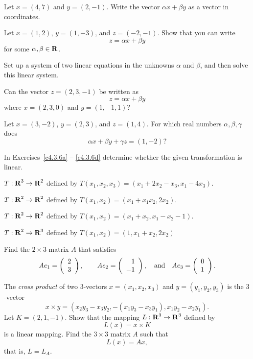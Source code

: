 \begin{exercise} \label{c4.3.2}
Let $x=(4,7)$ and $y=(2,-1)$.  Write the vector $\alpha x+\beta
y$ as a vector in coordinates.
\end{exercise}

\begin{exercise} \label{c4.3.3}
Let $x=(1,2)$, $y=(1,-3)$, and $z=(-2,-1)$.  Show that you can
write
\[
z=\alpha x+ \beta y
\]
for some $\alpha,\beta\in\mbox{$\bf{R}$}$.

 Set up a system of two linear equations in
the unknowns $\alpha$ and $\beta$, and then solve this linear
system.
\end{exercise}

\begin{exercise} \label{c4.3.4}
Can the vector $z=(2,3,-1)$ be written as
\[
z=\alpha x+ \beta y
\]
where $x=(2,3,0)$ and $y=(1,-1,1)$?
\end{exercise}

\begin{exercise} \label{c4.3.5}
Let $x=(3,-2)$, $y=(2,3)$, and $z=(1,4)$.  For which real
numbers $\alpha,\beta,\gamma$ does
\[
\alpha x + \beta y + \gamma z = (1,-2)?
\]
\end{exercise}

\noindent In Exercises~\ref{c4.3.6a} -- \ref{c4.3.6d} determine
whether the given transformation is linear.
\begin{exercise} \label{c4.3.6a}
  $T:\mbox{$\bf{R}$}^3\to\mbox{$\bf{R}$}^2$ defined by $T(x_1,x_2,x_3)=(x_1+2x_2-x_3,x_1-4x_3)$.
\end{exercise}
\begin{exercise} \label{c4.3.6b}
  $T:\mbox{$\bf{R}$}^2\to\mbox{$\bf{R}$}^2$ defined by $T(x_1,x_2)=(x_1+x_1x_2,2x_2)$.
\end{exercise}
\begin{exercise} \label{c4.3.6c}
  $T:\mbox{$\bf{R}$}^2\to\mbox{$\bf{R}$}^2$ defined by $T(x_1,x_2)=(x_1+x_2,x_1-x_2-1)$.
\end{exercise}
\begin{exercise} \label{c4.3.6d}
  $T:\mbox{$\bf{R}$}^2\to\mbox{$\bf{R}$}^3$ defined by $T(x_1,x_2)=(1,x_1+x_2,2x_2)$
\end{exercise}

\begin{exercise} \label{c4.3.7}
Find the $2\times 3$ matrix $A$ that satisfies
\[
Ae_1  =  \left(\begin{array}{r} 2 \\ 3\end{array}\right),\qquad
Ae_2  =  \left(\begin{array}{r} 1 \\ -1\end{array}\right), \quad\mbox{and}\quad
Ae_3  = \left(\begin{array}{r} 0 \\ 1\end{array}\right).
\]
\end{exercise}

\begin{exercise} \label{c4.3.8}
The {\em cross product\/} of two $3$-vectors $x=(x_1,x_2,x_3)$
and $y=(y_1,y_2,y_3)$ is the $3$-vector
\[
x\times y = (x_2y_3-x_3y_2,-(x_1y_3-x_3y_1),x_1y_2-x_2y_1).
\]
Let $K=(2,1,-1)$.  Show that the mapping $L:\mbox{$\bf{R}$}^3\to\mbox{$\bf{R}$}^3$ defined by
\[
L(x) = x\times K
\]
is a linear mapping.  Find the $3\times 3$ matrix $A$ such that
\[
L(x) = Ax,
\]
that is, $L=L_A$.
\end{exercise}

